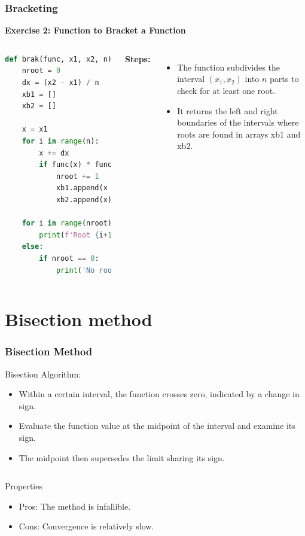   \begin{frame}[fragile]
    \frametitle{Bracketing}
    
    \textbf{Exercise 2: Function to Bracket a Function}
    \begin{columns}
    \begin{lstlisting}[language=Python,basicstyle=\scriptsize]
def brak(func, x1, x2, n):
    nroot = 0
    dx = (x2 - x1) / n
    xb1 = []
    xb2 = []

    x = x1
    for i in range(n):
        x += dx
        if func(x) * func(x - dx) <= 0:
            nroot += 1
            xb1.append(x - dx)
            xb2.append(x)

    for i in range(nroot):
        print(f'Root {i+1} in bracketing interval [{xb1[i]}, {xb2[i]}]')
    else:
        if nroot == 0:
            print('No roots found!')
    \end{lstlisting}
    \textbf{Steps:}
    \begin{itemize}
      \item The function subdivides the interval \((x_1, x_2)\) into \(n\) parts to check for at least one root.
      \item It returns the left and right boundaries of the intervals where roots are found in arrays xb1 and xb2.
    \end{itemize}
  \end{columns}
  \end{frame}
  
  \section{Bisection method}
  \begin{frame}[fragile]
    \frametitle{Bisection Method}
  
    Bisection Algorithm:
    \begin{itemize}
      \item Within a certain interval, the function crosses zero, indicated by a change in sign.
      \item Evaluate the function value at the midpoint of the interval and examine its sign.
      \item The midpoint then supersedes the limit sharing its sign.
    \end{itemize}
  
    \begin{columns}
    \vspace{0.5cm}
    \centering
    
  
    \begin{block}{Properties}
    \begin{itemize}
      \item Pros: The method is infallible.
      \item Cons: Convergence is relatively slow.
    \end{itemize}
  \end{block}
  \end{columns}
  \end{frame}
  

